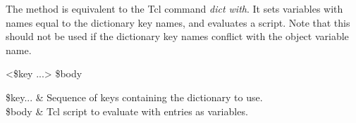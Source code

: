 \documentclass{article}
\begin{document}
The method  is equivalent to the Tcl command \textit{dict with}. 
It sets variables with names equal to the dictionary key names, and evaluates a script. 
Note that this should not be used if the dictionary key names conflict with the object variable name.
\begin{syntax}
 <\$key ...> \$body
\end{syntax}
\begin{args}
\$key... & Sequence of keys containing the dictionary to use. \\
\$body & Tcl script to evaluate with entries as variables.
\end{args}


\clearpage
{\small\printindex}
\end{document}
